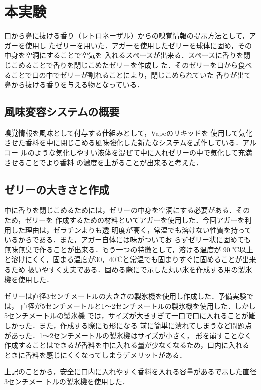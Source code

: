 \section{本実験}

口から鼻に抜ける香り（レトロネーザル）からの嗅覚情報の提示方法として，アガーを使用し
たゼリーを用いた．アガーを使用したゼリーを球体に固め，その中身を空洞にすることで空気を
入れるスペースが出来る．スペースに香りを閉じこめることで香りを閉じこめたゼリーを作成し
た．そのゼリーを口から食べることで口の中でゼリーが割れることにより，閉じこめられていた
香りが出て鼻から抜ける香りを与える物となっている．

\subsection{風味変容システムの概要}

嗅覚情報を風味として付与する仕組みとして，Vapeのリキッドを
使用して気化させた香料を中に閉じこめる風味強化した新たなシステムを試作している．アルコー
ルのような気化しやすい液体を混ぜて中に入れゼリーの中で気化して充満させることでより香料
の濃度を上がることが出来ると考えた．


\subsection{ゼリーの大きさと作成}

中に香りを閉じこめるためには，ゼリーの中身を空洞にする必要がある．そのため，ゼリーを
作成するための材料といてアガーを使用した．今回アガーを利用した理由は，ゼラチンよりも透
明度が高く，常温でも溶けない性質を持っているからである．また，アガー自体には味がついてお
らずゼリー状に固めても無味無臭で作ることが出来る．もう一つの特徴として，溶ける温度が 90
℃以上と溶けにくく，固まる温度が30，40℃と常温でも固まりすぐに固めることが出来るため
扱いやすく丈夫である．固める際にで示した丸い氷を作成する用の製氷機を使用した．


ゼリーは直径3センチメートルの大きさの製氷機を使用し作成した．予備実験では，
直径が5センチメートルと1～2センチメートルの製氷機を使用した．しかし5センチメートルの製氷機
では，サイズが大きすぎて一口で口に入れることが難しかった．また，作成する際にも形になる
前に簡単に潰れてしまうなど問題点があった．1～2センチメートルの製氷機はサイズが小さく，
形を崩すことなく作成することはできるが香料を中に入れる量が少なくなるため，口内に入れる
ときに香料を感じにくくなってしまうデメリットがある．


上記のことから，安全に口内に入れやすく香料を入れる容量があるで示した直径3センチメー
トルの製氷機を使用した．


